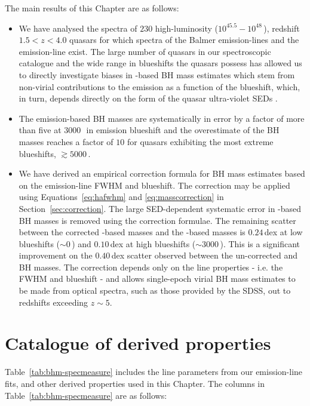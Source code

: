 The main results of this Chapter are as follows: 

\begin{itemize}
\item We have analysed the spectra of $230$ high-luminosity ($10^{45.5}-10^{48}$\,\ergs), redshift $1.5 < z < 4.0$ quasars for which spectra of the Balmer emission-lines and the  emission-line exist.
The large number of quasars in our spectroscopic catalogue and the wide range in  blueshifts the quasars possess has allowed us to directly investigate biases in -based BH mass estimates which stem from non-virial contributions to the  emission as a function of the  blueshift, which, in turn, depends directly on the form of the quasar ultra-violet SEDs \citep{richards11}.
\item The  emission-based BH masses are systematically in error by a factor of more than five at $3000$\,\kms\, in  emission blueshift and the overestimate of the BH masses reaches a factor of $10$ for quasars exhibiting the most extreme blueshifts, $\gtrsim5000$\,\kms. 
\item We have derived an empirical correction formula for BH mass estimates based on the  emission-line FWHM and blueshift.
The correction may be applied using Equations~\ref{eq:hafwhm} and \ref{eq:masscorrection} in Section~\ref{sec:correction}.
The large SED-dependent systematic error in -based BH masses is removed using the correction formulae.
The remaining scatter between the corrected -based masses and the \hans-based masses is $0.24$\,dex at low  blueshifts ($\sim0$\,\kms) and $0.10$\,dex at high blueshifts ($\sim3000$\,\kms). 
This is a significant improvement on the $0.40$\,dex scatter observed between the un-corrected  and \ha BH masses. 
The correction depends only on the  line properties - i.e. the FWHM and blueshift - and allows single-epoch virial BH mass estimates to be made from optical spectra, such as those provided by the SDSS, out to redshifts exceeding $z\sim 5$. 
\end{itemize}




\section{Catalogue of derived properties}

Table~\ref{tab:bhm-specmeasure} includes the line parameters from our emission-line fits, and other derived properties used in this Chapter. 
The columns in Table~\ref{tab:bhm-specmeasure} are as follows:

